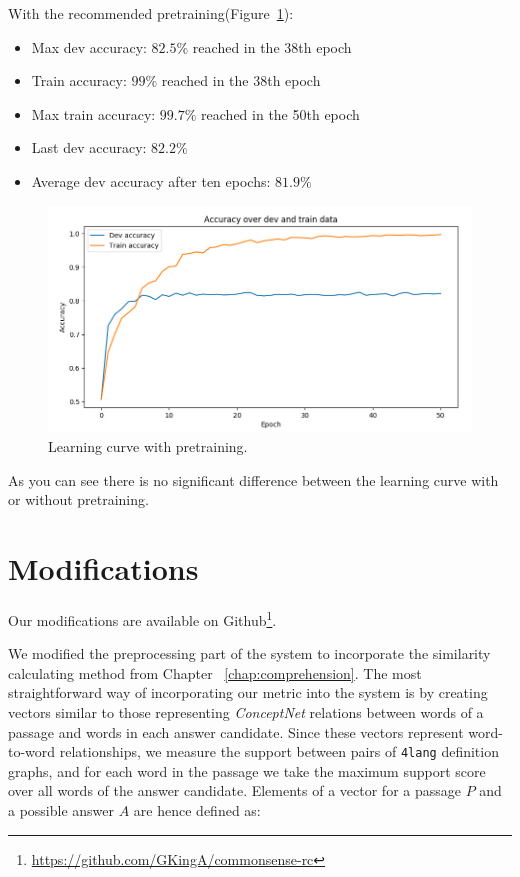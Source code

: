 \begin{minipage}{\linewidth}
With the recommended pretraining(Figure~\ref{fig:learning_curve2}):
\begin{itemize}
	\item Max dev accuracy: $82.5\%$ reached in the 38th epoch
	\item Train accuracy: $99\%$ reached in the 38th epoch
	\item Max train accuracy: $99.7\%$ reached in the 50th epoch
	\item Last dev accuracy: $82.2\%$
	\item Average dev accuracy after ten epochs: $81.9\%$
\end{itemize}
\end{minipage}
\begin{figure}[!htb]
	\centering
	\includegraphics[scale=0.5]{learning_curve2.jpg}
	\caption{Learning curve with pretraining.}
	\label{fig:learning_curve2}
\end{figure}

As you can see there is no significant difference between the learning curve with or without pretraining.

\section{Modifications}
Our modifications are available on Github\footnote{\url{https://github.com/GKingA/commonsense-rc}}.

We modified the preprocessing part of the system to incorporate the similarity calculating method from Chapter ~\ref{chap:comprehension}. The most straightforward way of incorporating our metric into the system is by creating vectors similar to those representing \textit{ConceptNet} relations between words of a passage and words in each answer candidate. Since these vectors represent
word-to-word relationships, we measure the support between pairs of \texttt{4lang} definition graphs, and for each word in the passage we take the maximum support score over all words of the answer candidate. Elements of a vector for a passage $P$ and a possible answer $A$ are hence defined as:

